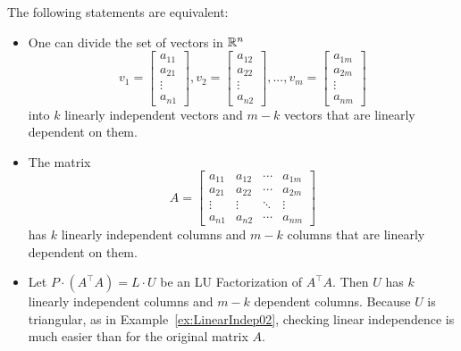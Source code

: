 \begin{tcolorbox}[title=\textbf{\large Number of Linearly Independent Vectors in  a Finite Set}] 
The following statements are equivalent:
\begin{itemize}
    \item One can divide the set of vectors in $\mathbb R^n$
\begin{equation}
\label{eq:VectorsFiniteList} v_1=\begin{bmatrix} a_{11} \\ a_{21}\\ \vdots \\ a_{n1} \end{bmatrix}, v_2=\begin{bmatrix} a_{12} \\ a_{22}\\ \vdots \\ a_{n2} \end{bmatrix}, ..., v_m=\begin{bmatrix} a_{1m} \\ a_{2m}\\ \vdots \\ a_{nm} \end{bmatrix}
\end{equation}
into $k$ linearly independent vectors and $m-k$ vectors that are linearly dependent on them.
\item The matrix 
\begin{equation}
\label{eq:MatrixFromLinearIndependence_IndepColumns}    
A=\left[\begin{array}{cccc} a_{11}& a_{12}& \cdots & a_{1m} \\
 a_{21}& a_{22}& \cdots & a_{2m}  \\
 \vdots & \vdots&  \ddots & \vdots \\
 a_{n1}& a_{n2}& \cdots & a_{nm} 
 \end{array}\right]
 \end{equation}
 has $k$ linearly independent columns and $m-k$ columns that are linearly dependent on them.
 \item Let $P \cdot \left(A^\top A \right) = L \cdot U$ be an LU Factorization of $A^\top A$. Then $U$ has $k$ linearly independent columns and $m-k$ dependent columns. Because $U$ is triangular, as in Example~\ref{ex:LinearIndep02}, checking linear independence is much easier than for the original matrix $A$.

\end{itemize}

\end{tcolorbox}

